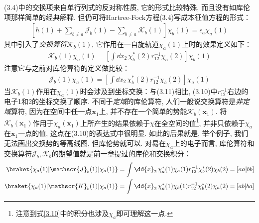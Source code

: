 (3.4)中的交换项来自单行列式的反对称性质, 它的形式比较特殊, 而且没有如库伦项那样简单的经典解释. 但仍可将Hartree-Fock方程(3.4)写成本征值方程的形式：
\begin{align}
\left[ h(1) + \sum_{b\neq a}\mathscr{J}_b(1) - \sum_{b\neq a}\mathscr{K}_b(1)   \right]\chi_b(1) = \epsilon_a\chi_a(1)
\end{align}
其中引入了\emph{交换算符}$\mathscr{K}_b(1)$, 它作用在一自旋轨道$\chi_a(1)$上时的效果定义如下：
\begin{align}
\label{3.10}
\mathscr{K}_b(1)\chi_a(1) = \left[ \int\dd{x}_2\,\chi_b^*(2)r_{12}^{-1}\chi_a(2) \right]\chi_b(1)
\end{align}
注意它与之前对库伦算符的定义做比较：
\begin{align}
\label{3.11}
\mathscr{J}_b(1)\chi_a(1) = \left[ \int\dd{x}_2\,\chi_b^*(2)r_{12}^{-1}\chi_b(2) \right]\chi_a(1)
\end{align}
当$\mathscr{K}_b(1)$作用在$\chi_a(1)$时会涉及到坐标交换：与(3.11)相比, (3.10)中$r_{12}^{-1}$右边的电子1和2的坐标交换了顺序. 不同于\emph{定域}的库伦算符, 人们一般说交换算符是\emph{非定域}算符, 因为在空间中任一点$\mathbf{x}_1$上, 并不存在一个简单的势能$\mathscr{K}_b(\mathbf{x}_1)$. 将$\mathscr{K}_b(\mathbf{x}_1)$作用于$\chi_a(\mathbf{x}_1)$上所产生的结果依赖于$\chi$在全空间的值\footnote{
注意到式\eqref{3.10}中的积分也涉及$\chi_a$即可理解这一点.
}, 并非只依赖于$\chi_a$在$\mathbf{x}_1$一点的值, 这点在(3.10)的表达式中很明显. 如此的后果就是, 举个例子, 我们无法画出交换势的等高线图, 但库伦势就可以. 对易在$\chi_a$上的电子而言, 库伦算符和交换算符$\mathscr{J}_b,\mathscr{K}_b$的期望值就是前一章提过的库伦和交换积分：
\begin{align}
\braket{\chi_a(1)|\mathscr{J}_b(1)|\chi_a(1)} & = \int\dd{x}_2\,\chi_a^*(1)\chi_a(1)r_{12}^{-1}\chi_b^*(2)\chi_b(2) = [aa|bb]\\
\braket{\chi_a(1)|\mathscr{K}_b(1)|\chi_a(1)} & = \int\dd{x}_2\,\chi_a^*(1)\chi_b(1)r_{12}^{-1}\chi_b^*(2)\chi_a(2) = [ab|ba]
\end{align}

